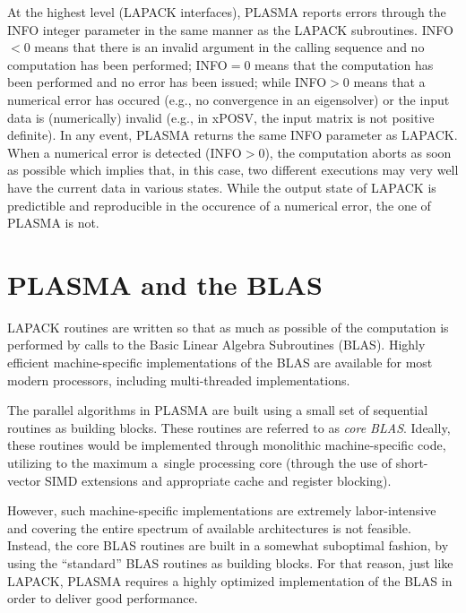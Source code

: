At the highest level (LAPACK interfaces), PLASMA reports errors through the
INFO integer parameter in the same manner as the LAPACK subroutines. 
INFO$<0$ means that there is an invalid argument in the calling sequence and no
computation has been performed; INFO$=0$ means that the computation has been
performed and no error has been issued; while INFO$>0$ means that a numerical
error has occured (e.g., no convergence in an eigensolver) or the input data is
(numerically) invalid (e.g., in xPOSV, the input matrix is not positive
definite). In any event, PLASMA returns the same INFO parameter as LAPACK.
When a numerical error is detected (INFO$>0$), the computation aborts as soon
as possible which implies that, in this case,
two different executions may very well have the current data in various states.
While the output state of LAPACK is predictible and
reproducible in the occurence of a numerical error, the one of PLASMA is not.


\section{PLASMA and the BLAS}

LAPACK routines are written so that as much as possible of the computation is performed by calls
to the Basic Linear Algebra Subroutines (BLAS).
Highly efficient \mbox{machine-specific} implementations of the BLAS are available for most modern
processors, including \mbox{multi-threaded} implementations.

The parallel algorithms in PLASMA are built using a small set of sequential routines as building
blocks.
These routines are referred to as {\em core BLAS}.
Ideally, these routines would be implemented through monolithic \mbox{machine-specific} code, utilizing
to the maximum \mbox{a single} processing core (through the use of \mbox{short-vector} SIMD extensions
and appropriate cache and register blocking).

However, such \mbox{machine-specific} implementations are extremely
labor-intensive and covering the entire spectrum of available
architectures is not feasible.
Instead, the core BLAS routines are built in a somewhat suboptimal fashion, by using the
``standard'' BLAS routines as building blocks.
For that reason, just like LAPACK, PLASMA requires a highly optimized implementation of the BLAS
in order to deliver good performance.

